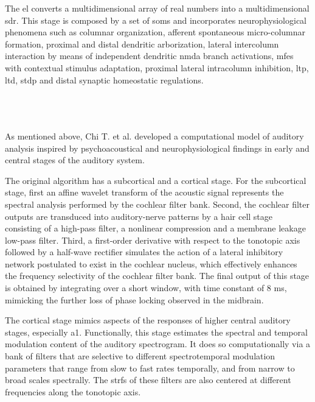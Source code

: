 \documentclass[10pt,letterpaper]{article}
\begin{document}
The \gls{el} converts a multidimensional array of real numbers into a multidimensional \gls{sdr}. This stage is composed by a set of \glspl{som} \cite{kohonen_2082, Kohonen:1989:SAM:69371} and incorporates neurophysiological phenomena such as columnar organization, afferent spontaneous micro-columnar formation, proximal and distal dendritic arborization, lateral intercolumn interaction by means of independent dendritic \gls{nmda} branch activations, \glspl{mfe} with contextual stimulus adaptation, proximal lateral intracolumn inhibition, \gls{ltp}, \gls{ltd}, \gls{stdp} and distal synaptic homeostatic regulations.


~\\
~\\
~\\

As mentioned above, Chi T. et al. \cite{chi_2005} developed a computational model of auditory analysis inspired by psychoacoustical and
neurophysiological findings in early and central stages of the auditory system.

The original algorithm has a subcortical and a cortical stage.
For the subcortical stage, first an affine wavelet transform of the acoustic signal
represents the spectral analysis performed by the cochlear filter bank.
Second, the cochlear filter outputs are transduced into auditory-nerve
patterns by a hair cell stage consisting of a high-pass filter,
a nonlinear compression and a membrane leakage low-pass filter.
Third, a first-order derivative with respect to the tonotopic axis
followed by a half-wave rectifier
simulates the action of a lateral inhibitory
network postulated to exist in the cochlear nucleus,
which effectively enhances the frequency
selectivity of the cochlear filter bank.
The final output of this stage is obtained by integrating
over a short window, with time constant of 8 ms, mimicking
the further loss of phase locking observed
in the midbrain.

The cortical stage mimics aspects of the responses of higher
central auditory stages, especially \gls{a1}.
Functionally, this stage estimates the
spectral and temporal modulation content of the auditory
spectrogram. It does so computationally via a bank of filters
that are selective to different spectrotemporal modulation parameters
that range from slow to fast rates temporally, and
from narrow to broad scales spectrally. The \glspl{strf}
of these filters are also centered at
different frequencies along the tonotopic axis.
\end{document}
